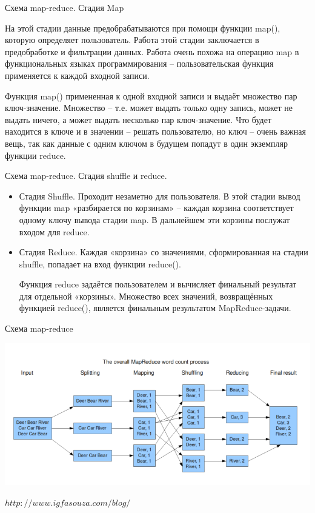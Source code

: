 \documentclass{beamer}
\begin{document}
\begin{frame}{Схема map-reduce. Стадия Map} 

    На этой стадии данные предобрабатываются при помощи функции map(), которую определяет пользователь. Работа этой стадии заключается в предобработке и фильтрации данных. Работа очень похожа на операцию map в функциональных языках программирования – пользовательская функция применяется к каждой входной записи.

Функция map() примененная к одной входной записи и выдаёт множество пар ключ-значение. Множество – т.е. может выдать только одну запись, может не выдать ничего, а может выдать несколько пар ключ-значение. Что будет находится в ключе и в значении – решать пользователю, но ключ – очень важная вещь, так как данные с одним ключом в будущем попадут в один экземпляр функции reduce.

\end{frame}

\begin{frame}{Схема map-reduce. Стадия shuffle и  reduce.} 


\begin{itemize}

\item   Стадия Shuffle. Проходит незаметно для пользователя. В этой стадии вывод функции map «разбирается по корзинам» – каждая корзина соответствует одному ключу вывода 
стадии map. В дальнейшем эти корзины послужат входом для reduce.


\item   Стадия Reduce. Каждая «корзина» со значениями, сформированная на стадии shuffle, попадает на вход функции reduce().

Функция reduce задаётся пользователем и вычисляет финальный результат для отдельной «корзины».
Множество всех значений, возвращённых функцией reduce(), является финальным результатом MapReduce-задачи. 

\end{itemize}

\end{frame}

\begin{frame}{Схема map-reduce}

\includegraphics[scale=0.4]{ris_01.png}

$http://www.igfasouza.com/blog/$

\end{frame}
\end{document}

